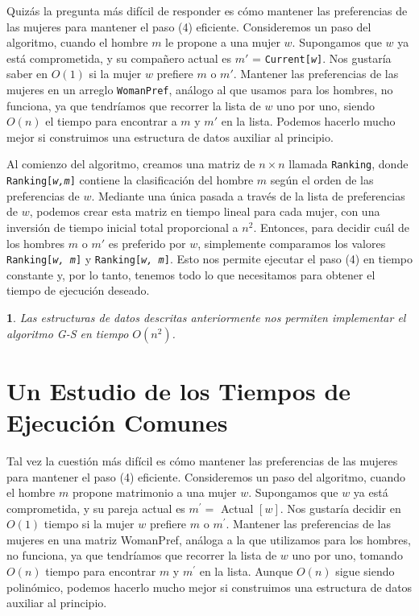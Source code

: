 \documentclass[a4paper, 12pt]{book}
\theoremstyle{dotless}
\newtheorem{theorem}{}[section]
\begin{document}
Quizás la pregunta más difícil de responder es cómo mantener las preferencias de las mujeres para mantener el paso (4) eficiente. Consideremos un paso del algoritmo, cuando el hombre $m$ le propone a una mujer $w$. Supongamos que $w$ ya está comprometida, y su compañero actual es $m'$ = \texttt{Current[\textit{w}]}. Nos gustaría saber en $O(1)$ si la mujer $w$ prefiere $m$ o $m'$. Mantener las preferencias de las mujeres en un arreglo \texttt{WomanPref}, análogo al que usamos para los hombres, no funciona, ya que tendríamos que recorrer la lista de $w$ uno por uno, siendo $O(n)$ el tiempo para encontrar a $m$ y $m'$ en la lista. Podemos hacerlo mucho mejor si construimos una estructura de datos auxiliar al principio.

Al comienzo del algoritmo, creamos una matriz de $n \times n$ llamada \texttt{Ranking}, donde \texttt{Ranking[\textit{w,m}]} contiene la clasificación del hombre $m$ según el orden de las preferencias de $w$. Mediante una única pasada a través de la lista de preferencias de $w$, podemos crear esta matriz en tiempo lineal para cada mujer, con una inversión de tiempo inicial total proporcional a $n^2$. Entonces, para decidir cuál de los hombres $m$ o $m'$ es preferido por $w$, simplemente comparamos los valores \texttt{Ranking[\textit{w, m}]} y \texttt{Ranking[\textit{w, m}]}. Esto nos permite ejecutar el paso (4) en tiempo constante y, por lo tanto, tenemos todo lo que necesitamos para obtener el tiempo de ejecución deseado.

\noindent\colorbox{mygray}{\parbox{\textwidth}{
\begin{theorem}
Las estructuras de datos descritas anteriormente nos permiten implementar el algoritmo G-S en tiempo $O(n^2)$.
\end{theorem}
}}


\section{Un Estudio de los Tiempos de Ejecución Comunes}

Tal vez la cuestión más difícil es cómo mantener las preferencias de las mujeres para mantener el paso (4) eficiente. Consideremos un paso del algoritmo, cuando el hombre $m$ propone matrimonio a una mujer $w$. Supongamos que $w$ ya está comprometida, y su pareja actual es $m^{\prime}=$ Actual $[w]$. Nos gustaría decidir en $O(1)$ tiempo si la mujer $w$ prefiere $m$ o $m^{\prime}$. Mantener las preferencias de las mujeres en una matriz WomanPref, análoga a la que utilizamos para los hombres, no funciona, ya que tendríamos que recorrer la lista de $w$ uno por uno, tomando $O(n)$ tiempo para encontrar $m$ y $m^{\prime}$ en la lista. Aunque $O(n)$ sigue siendo polinómico, podemos hacerlo mucho mejor si construimos una estructura de datos auxiliar al principio.
\end{document}
